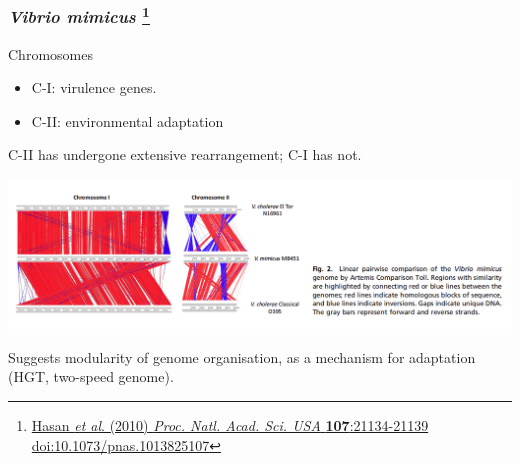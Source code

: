 \begin{frame}
  \frametitle{\textit{Vibrio mimicus} 
  \footnote{\tiny{\href{http://dx.doi.org/10.1073/pnas.1013825107}{Hasan \textit{et al}. (2010) \textit{Proc. Natl. Acad. Sci. USA} \textbf{107}:21134-21139 doi:10.1073/pnas.1013825107}}}
  }
  \begin{alertblock}{Chromosomes}
    \begin{itemize}
      \item C-I: virulence genes.
      \item C-II: environmental adaptation
    \end{itemize}
  \end{alertblock}
  \textcolor{hutton_green}{C-II has undergone extensive rearrangement}; C-I has not.\\
  \begin{center}
    \includegraphics[width=1\textwidth]{images/v_mimicus}
  \end{center}    
  Suggests \textcolor{hutton_blue}{modularity of genome organisation, as a mechanism for adaptation} (HGT, two-speed genome).
\end{frame}

